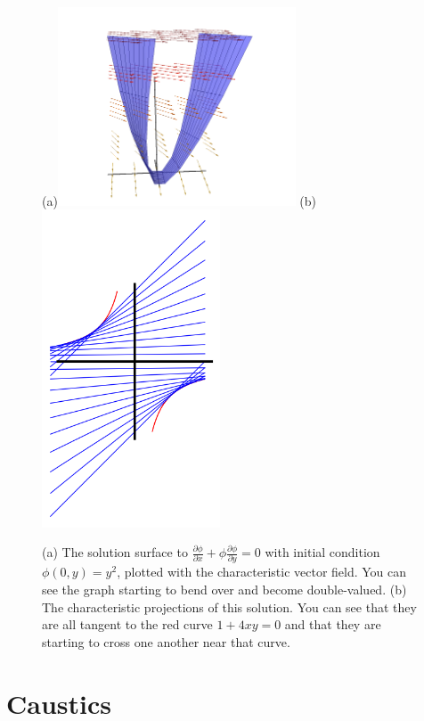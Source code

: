 \begin{figure}[htb]
\begin{center}
(a)\includegraphics[width=200pt]{quasilinear-characteristics2.jpg} (b)\includegraphics[width=150pt]{qcharacteristics2.png}
\end{center}
\caption{(a) The solution surface to $\frac{\partial\phi}{\partial x}+\phi\frac{\partial\phi}{\partial y}=0$ with initial condition $\phi(0,y)=y^2$, plotted with the characteristic vector field. You can see the graph starting to bend over and become double-valued. (b) The characteristic projections of this solution. You can see that they are all tangent to the red curve $1+4xy=0$ and that they are starting to cross one another near that curve.}
\label{fig-quasilinear-characteristics-2}
\end{figure}
\afterpage{\clearpage}

\section{Caustics}


